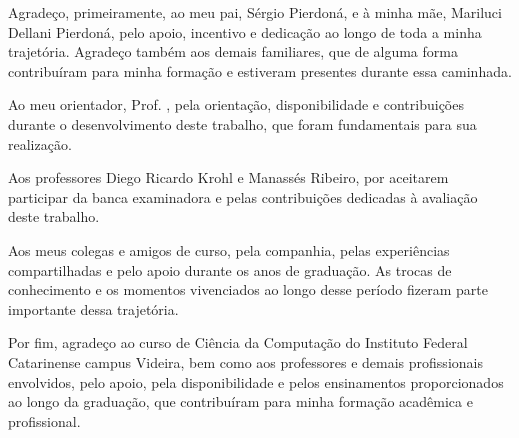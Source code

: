 \begin{agradecimentos}

Agradeço, primeiramente, ao meu pai, Sérgio Pierdoná, e à minha mãe, Mariluci Dellani Pierdoná, pelo apoio, incentivo e dedicação ao longo de toda a minha trajetória. Agradeço também aos demais familiares, que de alguma forma contribuíram para minha formação e estiveram presentes durante essa caminhada.

Ao meu orientador, Prof. \imprimirorientador, pela orientação, disponibilidade e contribuições durante o desenvolvimento deste trabalho, que foram fundamentais para sua realização.

Aos professores Diego Ricardo Krohl e Manassés Ribeiro, por aceitarem participar da banca examinadora e pelas contribuições dedicadas à avaliação deste trabalho.

Aos meus colegas e amigos de curso, pela companhia, pelas experiências compartilhadas e pelo apoio durante os anos de graduação. As trocas de conhecimento e os momentos vivenciados ao longo desse período fizeram parte importante dessa trajetória.

Por fim, agradeço ao curso de Ciência da Computação do Instituto Federal Catarinense campus Videira, bem como aos professores e demais profissionais envolvidos, pelo apoio, pela disponibilidade e pelos ensinamentos proporcionados ao longo da graduação, que contribuíram para minha formação acadêmica e profissional.

\end{agradecimentos}